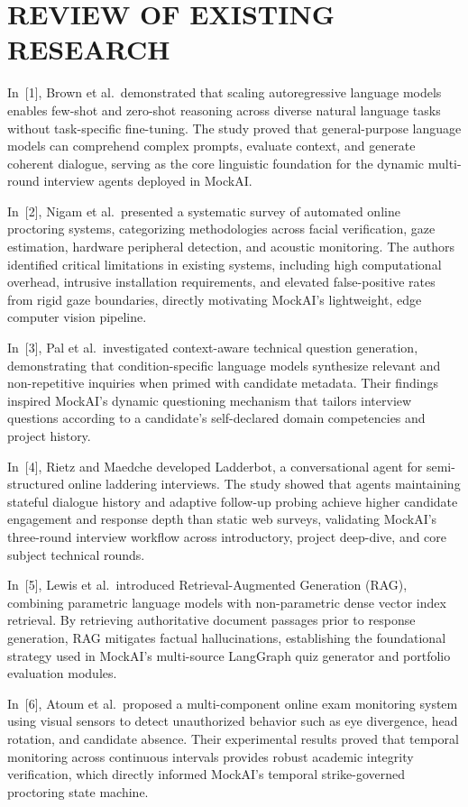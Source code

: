 \documentclass[12pt,a4paper]{report}
\begin{document}
\section{REVIEW OF EXISTING RESEARCH}

In~[1], Brown et al.\ demonstrated that scaling autoregressive language models enables
few-shot and zero-shot reasoning across diverse natural language tasks without task-specific
fine-tuning. The study proved that general-purpose language models can comprehend
complex prompts, evaluate context, and generate coherent dialogue, serving as the core
linguistic foundation for the dynamic multi-round interview agents deployed in MockAI.

In~[2], Nigam et al.\ presented a systematic survey of automated online proctoring systems,
categorizing methodologies across facial verification, gaze estimation, hardware peripheral
detection, and acoustic monitoring. The authors identified critical limitations in existing
systems, including high computational overhead, intrusive installation requirements, and
elevated false-positive rates from rigid gaze boundaries, directly motivating MockAI's
lightweight, edge computer vision pipeline.

In~[3], Pal et al.\ investigated context-aware technical question generation, demonstrating
that condition-specific language models synthesize relevant and non-repetitive inquiries
when primed with candidate metadata. Their findings inspired MockAI's dynamic
questioning mechanism that tailors interview questions according to a candidate's
self-declared domain competencies and project history.

In~[4], Rietz and Maedche developed Ladderbot, a conversational agent for semi-structured
online laddering interviews. The study showed that agents maintaining stateful dialogue
history and adaptive follow-up probing achieve higher candidate engagement and response
depth than static web surveys, validating MockAI's three-round interview workflow across
introductory, project deep-dive, and core subject technical rounds.

In~[5], Lewis et al.\ introduced Retrieval-Augmented Generation (RAG), combining
parametric language models with non-parametric dense vector index retrieval. By retrieving
authoritative document passages prior to response generation, RAG mitigates factual
hallucinations, establishing the foundational strategy used in MockAI's multi-source
LangGraph quiz generator and portfolio evaluation modules.

In~[6], Atoum et al.\ proposed a multi-component online exam monitoring system using
visual sensors to detect unauthorized behavior such as eye divergence, head rotation, and
candidate absence. Their experimental results proved that temporal monitoring across
continuous intervals provides robust academic integrity verification, which directly
informed MockAI's temporal strike-governed proctoring state machine.
\end{document}
